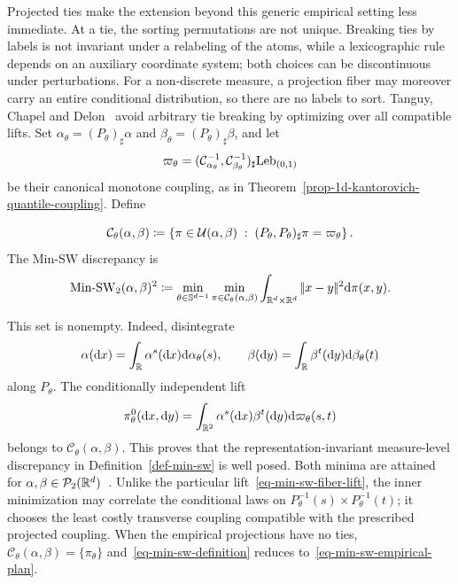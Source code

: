 Projected ties make the extension beyond this generic empirical setting less immediate. At a tie, the sorting permutations are not unique. Breaking ties by labels is not invariant under a relabeling of the atoms, while a lexicographic rule depends on an auxiliary coordinate system; both choices can be discontinuous under perturbations. For a non-discrete measure, a projection fiber may moreover carry an entire conditional distribution, so there are no labels to sort. Tanguy, Chapel and Delon~\cite{TanguyChapelDelon2025SlicedTransportPlans} avoid arbitrary tie breaking by optimizing over all compatible lifts. Set
$\alpha_\theta=(P_\theta)_\sharp\alpha$ and $\beta_\theta=(P_\theta)_\sharp\beta$, and let
\[
	\varpi_\theta
	=
	(\mathcal{C}_{\alpha_\theta}^{-1},\mathcal{C}_{\beta_\theta}^{-1})_\sharp
	\mathrm{Leb}_{(0,1)}
\]
be their canonical monotone coupling, as in Theorem~\ref{prop-1d-kantorovich-quantile-coupling}. Define
\begin{defn}\label{def-min-sw}
\begin{equation}\label{eq-min-sw-constrained-lifts}
	\mathcal C_\theta(\alpha,\beta)
	\coloneqq
	\left\{
		\pi\in\mathcal{U}(\alpha,\beta)
		\;:\;
		(P_\theta,P_\theta)_\sharp\pi=\varpi_\theta
	\right\}.
\end{equation}
The Min-SW discrepancy is
\begin{equation}\label{eq-min-sw-definition}
	\operatorname{Min\text{-}SW}_2(\alpha,\beta)^2
	\coloneqq
	\min_{\theta\in\mathbb{S}^{d-1}}
	\min_{\pi\in\mathcal C_\theta(\alpha,\beta)}
	\int_{\mathbb{R}^d\times\mathbb{R}^d}|\!| x-y |\!|^2\mathrm{d}\pi(x,y).
\end{equation}
\end{defn}
This set is nonempty. Indeed, disintegrate
\[
	\alpha(\mathrm{d} x)=\int_{\mathbb{R}} \alpha^s(\mathrm{d} x)\mathrm{d}\alpha_\theta(s),
	\qquad
	\beta(\mathrm{d} y)=\int_{\mathbb{R}} \beta^t(\mathrm{d} y)\mathrm{d}\beta_\theta(t)
\]
along $P_\theta$. The conditionally independent lift
\begin{equation}\label{eq-min-sw-fiber-lift}
	\pi_\theta^0(\mathrm{d} x,\mathrm{d} y)
	=
	\int_{\mathbb{R}^2}
	\alpha^s(\mathrm{d} x)\beta^t(\mathrm{d} y)
	\mathrm{d}\varpi_\theta(s,t)
\end{equation}
belongs to $\mathcal C_\theta(\alpha,\beta)$. This proves that the representation-invariant measure-level discrepancy in Definition~\ref{def-min-sw} is well posed.
Both minima are attained for $\alpha,\beta\in\mathcal{P}_2(\mathbb{R}^d)$~\cite{TanguyChapelDelon2025SlicedTransportPlans}. Unlike the particular lift~\eqref{eq-min-sw-fiber-lift}, the inner minimization may correlate the conditional laws on
$P_\theta^{-1}(s)\times P_\theta^{-1}(t)$; it chooses the least costly transverse coupling compatible with the prescribed projected coupling. When the empirical projections have no ties, $\mathcal C_\theta(\alpha,\beta)=\{\pi_\theta\}$ and~\eqref{eq-min-sw-definition} reduces to~\eqref{eq-min-sw-empirical-plan}.

